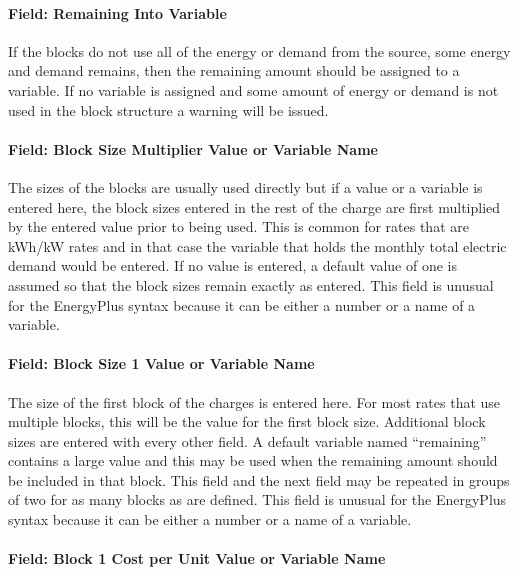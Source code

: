 \paragraph{Field: Remaining Into Variable}\label{field-remaining-into-variable}

If the blocks do not use all of the energy or demand from the source, some energy and demand remains, then the remaining amount should be assigned to a variable. If no variable is assigned and some amount of energy or demand is not used in the block structure a warning will be issued.

\paragraph{Field: Block Size Multiplier Value or Variable Name}\label{field-block-size-multiplier-value-or-variable-name}

The sizes of the blocks are usually used directly but if a value or a variable is entered here, the block sizes entered in the rest of the charge are first multiplied by the entered value prior to being used. This is common for rates that are kWh/kW rates and in that case the variable that holds the monthly total electric demand would be entered. If no value is entered, a default value of one is assumed so that the block sizes remain exactly as entered. This field is unusual for the EnergyPlus syntax because it can be either a number or a name of a variable.

\paragraph{Field: Block Size 1 Value or Variable Name}\label{field-block-size-1-value-or-variable-name}

The size of the first block of the charges is entered here. For most rates that use multiple blocks, this will be the value for the first block size. Additional block sizes are entered with every other field. A default variable named ``remaining'' contains a large value and this may be used when the remaining amount should be included in that block. This field and the next field may be repeated in groups of two for as many blocks as are defined. This field is unusual for the EnergyPlus syntax because it can be either a number or a name of a variable.

\paragraph{Field: Block 1 Cost per Unit Value or Variable Name}\label{field-block-1-cost-per-unit-value-or-variable-name}

